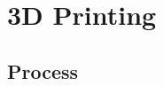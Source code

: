 \documentclass[11pt]{beamer}
\begin{document}

\section{3D Printing}

\subsection{Process}
\end{document}
